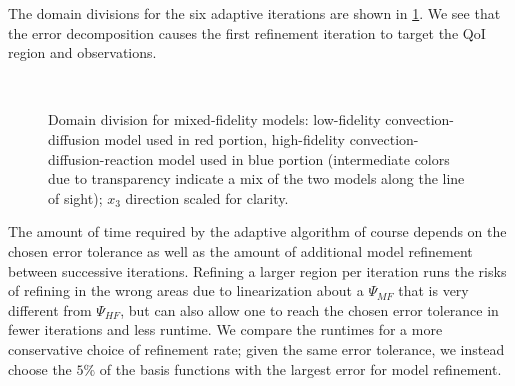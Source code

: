 The domain divisions for the six adaptive iterations are shown in \cref{fig:divvy3D}. We see that the error decomposition causes the first refinement iteration to target the QoI region and observations. 
%
\begin{figure}[htbp]
\centering
{}
 \\
\caption{Domain division for mixed-fidelity models: low-fidelity convection-diffusion model used in red portion, high-fidelity convection-diffusion-reaction model used in blue portion (intermediate colors due to transparency indicate a mix of the two models along the line of sight); $x_3$ direction scaled for clarity.}
\label{fig:divvy3D}
\end{figure} 
%
The amount of time required by the adaptive algorithm of course depends on the chosen error tolerance as well as the amount of additional model refinement between successive iterations. Refining a larger region per iteration runs the risks of refining in the wrong areas due to linearization about a $\Psi_{MF}$ that is very different from $\Psi_{HF}$, but can also allow one to reach the chosen error tolerance in fewer iterations and less runtime. We compare the runtimes for a more conservative choice of refinement rate; given the same error tolerance, we instead choose the $5\%$ of the basis functions with the largest error for model refinement. 

